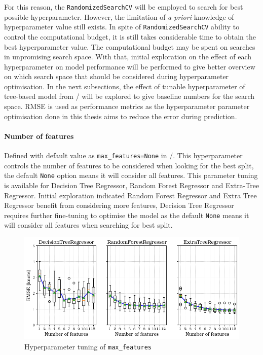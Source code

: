 For this reason, the {\tt RandomizedSearchCV} will be employed to search for best possible hyperparameter. However, the limitation of \emph{a priori} knowledge of hyperparameter value still exists. In spite of {\tt RandomizedSearchCV} ability to control the computational budget, it is still takes considerable time to obtain the best hyperparameter value. The computational budget may be spent on searches in unpromising search space. With that, initial exploration on the effect of each hyperparameter on model performance will be performed to give better overview on which search space that should be considered during hyperparameter optimisation. In the next subsections, the effect of tunable hyperparameter of tree-based model from \scikit/ will be explored to give baseline numbers for the search space. RMSE is used as performance metrics as the hyperparameter parameter optimisation done in this thesis aims to reduce the error during prediction. \\ 

\paragraph{Number of features}\label{max_features}

Defined with default value as {\tt max\_features=None} in \scikit/. This hyperparameter controls the number of features to be considered when looking for the best split, the default {\tt None} option means it will consider all features. This parameter tuning is available for Decision Tree Regressor, Random Forest Regressor and Extra-Tree Regressor. Initial exploration indicated Random Forest Regressor and Extra Tree Regressor benefit from considering more features, Decision Tree Regressor requires further fine-tuning to optimise the model as the default {\tt None} means it will consider all features when searching for best split.\\ 

\begin{figure}[h]
    \centering
        \includegraphics[width=.85\textwidth]{02_figures/hpo_n_features.png}
        \caption{Hyperparameter tuning of {\tt max\_features}}
        \label{fig:hpo_n_features}
\end{figure}

